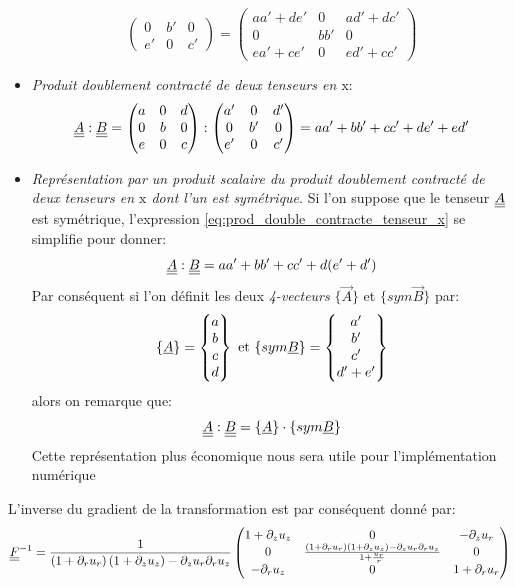 \documentclass[10pt]{book}
\begin{document}
\begin{itemize}
\begin{equation}
\begin{pmatrix}
0 & b' & 0\\
e' & 0 & c'
\end{pmatrix}=\begin{pmatrix}
aa'+de' & 0 & ad'+dc'\\
0 & bb' & 0\\
ea'+ce' & 0 & ed'+cc'
\end{pmatrix}
\label{eq:prod_contracte_tenseur_x}
\end{equation}
\item \emph{Produit doublement contracté de deux tenseurs en $\mathrm{x}$}:
\begin{equation}
\underline{\underline{A}}:\underline{\underline{B}}= \begin{pmatrix}
a & 0 & d\\
0 & b & 0\\
e & 0 & c
\end{pmatrix}:\begin{pmatrix}
a' & 0 & d'\\
0 & b' & 0\\
e' & 0 & c'
\end{pmatrix}=aa'+bb'+cc'+de'+ed'
\label{eq:prod_double_contracte_tenseur_x}
\end{equation}
\item \emph{Représentation par un produit scalaire du produit doublement contracté de deux tenseurs en $\mathrm{x}$ dont l'un est symétrique}. Si l'on suppose que le tenseur $\underline{\underline{A}}$ est symétrique, l'expression \eqref{eq:prod_double_contracte_tenseur_x} se simplifie pour donner:
$$\underline{\underline{A}}:\underline{\underline{B}}=aa'+bb'+cc'+d(e'+d')$$
Par conséquent si l'on définit les deux \emph{4-vecteurs} $\{\vec{A}\}$ et $\{sym\vec{B}\}$ par:
$$\{\underline{A}\}=\begin{Bmatrix}
a\\
b\\
c\\
d\\
\end{Bmatrix}\text{ et } \{sym\underline{B}\}=\begin{Bmatrix}
a'\\
b'\\
c'\\
d'+e'\\
\end{Bmatrix}$$
alors on remarque que: 
$$\underline{\underline{A}}:\underline{\underline{B}} = \{\underline{A}\}\cdot\{sym\underline{B}\}$$
Cette représentation plus économique nous sera utile pour l'implémentation numérique
\end{itemize}
L'inverse du gradient de la transformation est par conséquent donné par:
$$\underline{\underline{F}}^{-1}=\dfrac{1}{\left(1+\partial_{r}u_{r}\right)\left(1+\partial_{z}u_{z}\right)-\partial_{z}u_{r}\partial_{r}u_{z}}\begin{pmatrix}
1+\partial_{z}u_{z} & 0 & -\partial_{z}u_{r}\\
0 & \frac{\left(1+\partial_{r}u_{r}\right)\left(1+\partial_{z}u_{z}\right)-\partial_{z}u_{r}\partial_{r}u_{z}}{1+\frac{u_{r}}{r}} & 0\\
-\partial_{r}u_{z} & 0 & 1+\partial_{r}u_{r}
\end{pmatrix}$$
\end{document}
